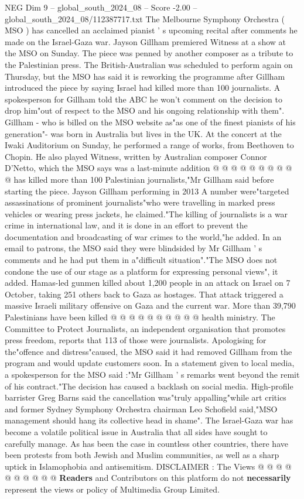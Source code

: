 \begin{textsample}{NEG Dim 9 – global\_south\_2024\_08 – Score -2.00 – global\_south\_2024\_08/112387717.txt}  \label{ex:f9_neg_337}
The Melbourne Symphony Orchestra ( MSO ) has cancelled an acclaimed pianist ' s upcoming recital after comments he made on the Israel-Gaza war.
Jayson Gillham premiered Witness at a show at the MSO on Sunday.
The piece was penned by another composer as a tribute to the Palestinian press.
The British-Australian was scheduled to perform again on Thursday, but the MSO has said it is reworking the programme after Gillham introduced the piece by saying Israel had killed more than 100 journalists.
A spokesperson for Gillham told the ABC he won't comment on the decision to drop him"out of respect to the MSO and his ongoing relationship with them".
Gillham - who is billed on the MSO website as"as one of the finest pianists of his generation"- was born in Australia but lives in the UK.
At the concert at the Iwaki Auditorium on Sunday, he performed a range of works, from Beethoven to Chopin.
He also played Witness, written by Australian composer Connor D'Netto, which the MSO says was a last-minute addition @ @ @ @ @ @ @ @ @ @ has killed more than 100 Palestinian journalists,"Mr Gillham said before starting the piece.
Jayson Gillham performing in 2013 A number were"targeted assassinations of prominent journalists"who were travelling in marked press vehicles or wearing press jackets, he claimed."The killing of journalists is a war crime in international law, and it is done in an effort to prevent the documentation and broadcasting of war crimes to the world,"he added.
In an email to patrons, the MSO said they were blindsided by Mr Gillham ' s comments and he had put them in a"difficult situation"."The MSO does not condone the use of our stage as a platform for expressing personal views", it added.
Hamas-led gunmen killed about 1,200 people in an attack on Israel on 7 October, taking 251 others back to Gaza as hostages.
That attack triggered a massive Israeli military offensive on Gaza and the current war.
More than 39,790 Palestinians have been killed @ @ @ @ @ @ @ @ @ @ health ministry.
The Committee to Protect Journalists, an independent organisation that promotes press freedom, reports that 113 of those were journalists.
Apologising for the"offence and distress"caused, the MSO said it had removed Gillham from the program and would update customers soon.
In a statement given to local media, a spokesperson for the MSO said :"Mr Gillham ' s remarks went beyond the remit of his contract."The decision has caused a backlash on social media.
High-profile barrister Greg Barns said the cancellation was"truly appalling"while art critics and former Sydney Symphony Orchestra chairman Leo Schofield said,"MSO management should hang its collective head in shame".
The Israel-Gaza war has become a volatile political issue in Australia that all sides have sought to carefully manage.
As has been the case in countless other countries, there have been protests from both Jewish and Muslim communities, as well as a sharp uptick in Islamophobia and antisemitism.
DISCLAIMER : The Views @ @ @ @ @ @ @ @ @ @ \textbf{Readers} and Contributors on this platform do not \textbf{necessarily} represent the views or policy of Multimedia Group Limited.

\end{textsample}
